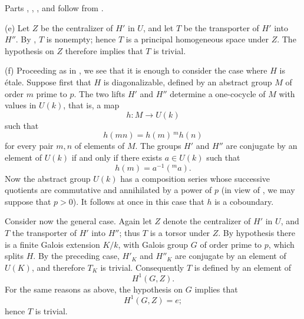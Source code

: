 
Parts , , , and  follow from .

\smallskip
\noindent
(e) Let \(Z\) be the centralizer of \(H'\) in \(U\), and let \(T\)
be the transporter of \(H'\) into \(H''\).  By , \(T\) is
nonempty; hence \(T\) is a principal homogeneous space under \(Z\).
The hypothesis on \(Z\) therefore implies that \(T\) is trivial.

\smallskip
\noindent
(f) Proceeding as in , we see that it is enough to consider the
case where \(H\) is étale.  Suppose first that \(H\) is
diagonalizable, defined by an abstract group \(M\) of order \(m\)
prime to \(p\).  The two lifts \(H'\) and \(H''\) determine a
one-cocycle of \(M\) with values in \(U(k)\), that is, a map
\[
  h:M\longrightarrow U(k)
\]
such that
\[
  h(mn)=h(m)\,{}^{m}\!h(n)
\]
for every pair \(m,n\) of elements of \(M\).  The groups \(H'\) and
\(H''\) are conjugate by an element of \(U(k)\) if and only if there
exists \(a\in U(k)\) such that
\[
  h(m)=a^{-1}({}^{m}\!a).
\]
Now the abstract group \(U(k)\) has a composition series whose
successive quotients are commutative and annihilated by a power of
\(p\) (in view of , we may suppose that \(p>0\)).  It follows
at once in this case that \(h\) is a coboundary.

Consider now the general case.  Again let \(Z\) denote the
centralizer of \(H'\) in \(U\), and \(T\) the transporter of \(H'\)
into \(H''\); thus \(T\) is a torsor under \(Z\).  By hypothesis there
is a finite Galois extension \(K/k\), with Galois group \(G\) of
order prime to \(p\), which splits \(H\).  By the preceding case,
\(H'_K\) and \(H''_K\) are conjugate by an element of \(U(K)\), and
therefore \(T_K\) is trivial.  Consequently \(T\) is defined by an
element of
\[
  H^1(G,Z).
\]
For the same reasons as above, the hypothesis on \(G\) implies that
\[
  H^1(G,Z)=e;
\]
hence \(T\) is trivial.



